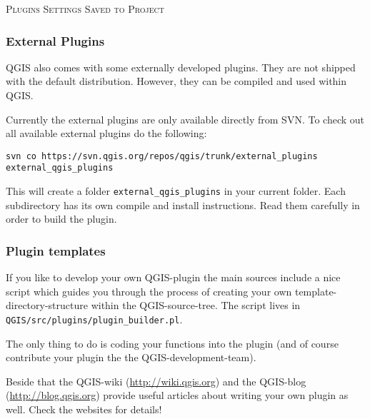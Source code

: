 \normalsize


\begin{Tip}\caption{\textsc{Plugins Settings Saved to Project}}
\end{Tip}

%
%
\subsubsection{External Plugins}\label{sec:external_plugins}

QGIS also comes with some externally developed plugins. They are not shipped with the
default distribution. However, they can be compiled and used within QGIS.

Currently the external plugins are only available directly from SVN. 
To check out all available external plugins do the following:
\begin{verbatim}
svn co https://svn.qgis.org/repos/qgis/trunk/external_plugins external_qgis_plugins
\end{verbatim}

This will create a folder \texttt{external\_qgis\_plugins} in your current folder.
Each subdirectory has its own compile and install instructions. Read them carefully
in order to build the plugin.

%
%
\subsubsection{Plugin templates}\label{sec:plugin_template}

If you like to develop your own QGIS-plugin the main sources include a nice script
which guides you through the process of creating your own template-directory-structure
within the QGIS-source-tree.
The script lives in \texttt{QGIS/src/plugins/plugin\_builder.pl}.

The only thing to do is coding your functions into the plugin (and of course contribute
your plugin the the QGIS-development-team).

Beside that the QGIS-wiki (\url{http://wiki.qgis.org}) and the QGIS-blog (\url{http://blog.qgis.org})
provide useful articles about writing your own plugin as well.
Check the websites for details!
